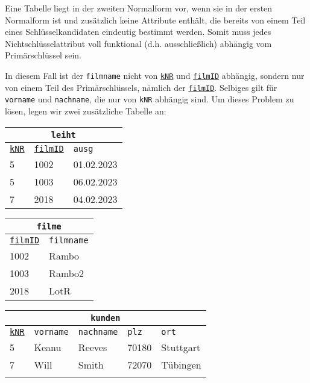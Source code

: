 \begin{tcolorbox}[title=Zweite Normalform]
	Eine Tabelle liegt in der zweiten Normalform vor, wenn sie in der ersten Normalform ist und zusätzlich keine Attribute enthält, die bereits von einem Teil eines Schlüsselkandidaten eindeutig bestimmt werden. Somit muss jedes Nichtschlüsselattribut voll funktional (d.h. ausschließlich) abhängig vom Primärschlüssel sein.
\end{tcolorbox}
In diesem Fall ist der \lstinline!filmname! nicht von \underline{\lstinline!kNR!} und \underline{\lstinline!filmID!} abhängig, sondern nur von einem Teil des Primärschlüssels, nämlich der \underline{\lstinline!filmID!}. Selbiges gilt für \lstinline!vorname! und \lstinline!nachname!, die nur von \lstinline!kNR! abhängig sind. Um dieses Problem zu lösen, legen wir zwei zusätzliche Tabelle an:\\
\begin{minipage}{\textwidth}
	\begin{minipage}{0.3\textwidth}
		\begin{tabular}{lll}
			\multicolumn{3}{c}{\lstinline!leiht!}\\
			\hline
			\underline{\lstinline!kNR!}&\underline{\lstinline!filmID!}&\lstinline!ausg!\\
			\hline
			5&1002&01.02.2023\\
			5&1003&06.02.2023\\
			7&2018&04.02.2023\\
		\end{tabular}
	\end{minipage}
	\begin{minipage}{0.228\textwidth}
		\begin{tabular}{ll}
			\multicolumn{2}{c}{\lstinline!filme!}\\
			\hline
			\underline{\lstinline!filmID!}&\lstinline!filmname!\\
			\hline
			1002&Rambo\\
			1003&Rambo2\\
			2018&LotR\\
		\end{tabular}
	\end{minipage}
	\begin{minipage}{0.472\textwidth}
		\begin{tabular}{lllll}
			\multicolumn{5}{c}{\lstinline!kunden!}\\
			\hline
			\underline{\lstinline!kNR!}&\lstinline!vorname!&\lstinline!nachname!&\lstinline!plz!&\lstinline!ort!\\
			\hline
			5&Keanu&Reeves&70180&Stuttgart\\
			7&Will&Smith&72070&Tübingen\\
			\phantom{0}&&&&\\
		\end{tabular}
	\end{minipage}
\end{minipage}

